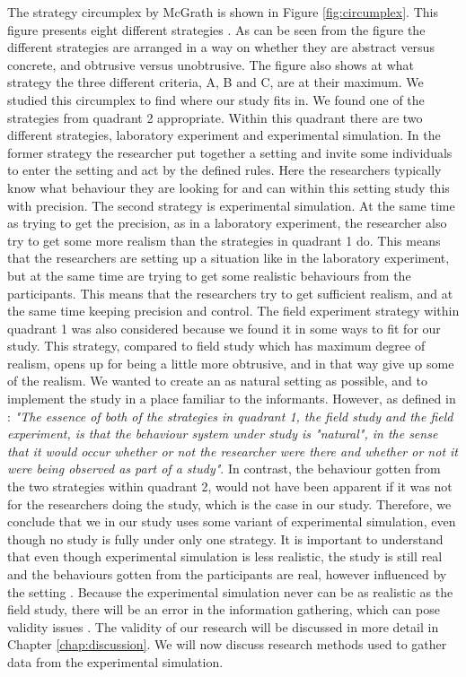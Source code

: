 The strategy circumplex by McGrath is shown in Figure \ref{fig:circumplex}. This figure presents eight different strategies \cite{McGrath}. As can be seen from the figure the different strategies are arranged in a way on whether they are abstract versus concrete, and obtrusive versus unobtrusive. The figure also shows at what strategy the three different criteria, A, B and C, are at their maximum. We studied this circumplex to find where our study fits in. We found one of the strategies from quadrant 2 appropriate. Within this quadrant there are two different strategies, laboratory experiment and experimental simulation. In the former strategy the researcher put together a setting and invite some individuals to enter the setting and act by the defined rules. Here the researchers typically know what behaviour they are looking for and can within this setting study this with precision. The second strategy is experimental simulation. At the same time as trying to get the precision, as in a laboratory experiment, the researcher also try to get some more realism than the strategies in quadrant 1 do. This means that the researchers are setting up a situation like in the laboratory experiment, but at the same time are trying to get some realistic behaviours from the participants. This means that the researchers try to get sufficient realism, and at the same time keeping precision and control. The field experiment strategy within quadrant 1 was also considered because we found it in some ways to fit for our study. This strategy, compared to field study which has maximum degree of realism, opens up for being a little more obtrusive, and in that way give up some of the realism. We wanted to create an as natural setting as possible, and to implement the study in a place familiar to the informants. However, as defined in \cite{McGrath}:  \emph{"The essence of both of the strategies in quadrant 1, the field study and the field experiment, is that the behaviour system under study is "natural", in the sense that it would occur whether or not the researcher were there and whether or not it were being observed as part of a study"}. In contrast, the behaviour gotten from the two strategies within quadrant 2, would not have been apparent if it was not for the researchers doing the study, which is the case in our study. Therefore, we conclude that we in our study uses some variant of experimental simulation, even though no study is fully under only one strategy. It is important to understand that even though experimental simulation is less realistic, the study is still real and the behaviours gotten from the participants are real, however influenced by the setting \cite{McGrath}. Because the experimental simulation never can be as realistic as the field study, there will be an error in the information gathering, which can pose validity issues \cite{alsos}. The validity of our research will be discussed in more detail in Chapter \ref{chap:discussion}. We will now discuss research methods used to gather data from the experimental simulation. 


